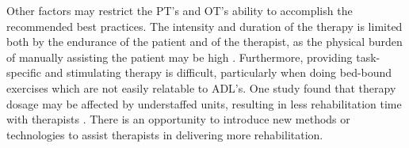 \documentclass[12pt]{report}
\begin{document}
Other factors may restrict the PT's and OT's ability to accomplish the recommended best practices. The intensity and duration of the therapy is limited both by the endurance of the patient and of the therapist, as the physical burden of manually assisting the patient may be high \cite{Colombo}. Furthermore, providing task-specific and stimulating therapy is difficult, particularly when doing bed-bound exercises which are not easily relatable to ADL's. One study found that therapy dosage may be affected by understaffed units, resulting in less rehabilitation time with therapists \cite{Mchugh2013}. There is an opportunity to introduce new methods or technologies to assist therapists in delivering more rehabilitation.








\end{document}

